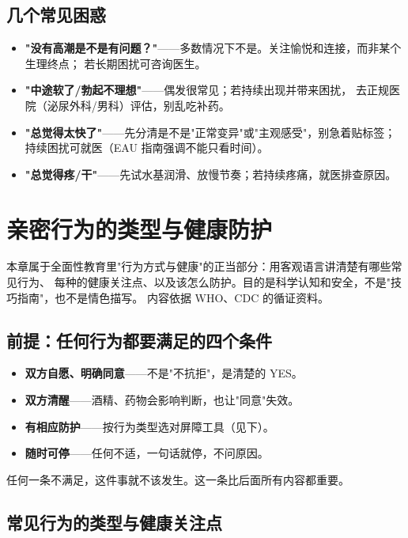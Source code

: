\documentclass[12pt,UTF8,openany]{ctexbook}
\begin{document}
\section{几个常见困惑}

\begin{itemize}[leftmargin=2em]
  \item \textbf{"没有高潮是不是有问题？"}——多数情况下不是。关注愉悦和连接，而非某个生理终点；
        若长期困扰可咨询医生。
  \item \textbf{"中途软了/勃起不理想"}——偶发很常见；若持续出现并带来困扰，
        去正规医院（泌尿外科/男科）评估，别乱吃补药。
  \item \textbf{"总觉得太快了"}——先分清是不是"正常变异"或"主观感受"，别急着贴标签；
        持续困扰可就医（EAU 指南强调不能只看时间）。
  \item \textbf{"总觉得疼/干"}——先试水基润滑、放慢节奏；若持续疼痛，就医排查原因。
\end{itemize}

\chapter{亲密行为的类型与健康防护}
\label{chap:practices}

本章属于全面性教育里"行为方式与健康"的正当部分：用客观语言讲清楚有哪些常见行为、
每种的健康关注点、以及该怎么防护。目的是科学认知和安全，不是"技巧指南"，也不是情色描写。
内容依据 WHO、CDC 的循证资料。

\section{前提：任何行为都要满足的四个条件}

\begin{itemize}[leftmargin=2em]
  \item \textbf{双方自愿、明确同意}——不是"不抗拒"，是清楚的 YES。
  \item \textbf{双方清醒}——酒精、药物会影响判断，也让"同意"失效。
  \item \textbf{有相应防护}——按行为类型选对屏障工具（见下）。
  \item \textbf{随时可停}——任何不适，一句话就停，不问原因。
\end{itemize}

任何一条不满足，这件事就不该发生。这一条比后面所有内容都重要。

\section{常见行为的类型与健康关注点}
\end{document}
